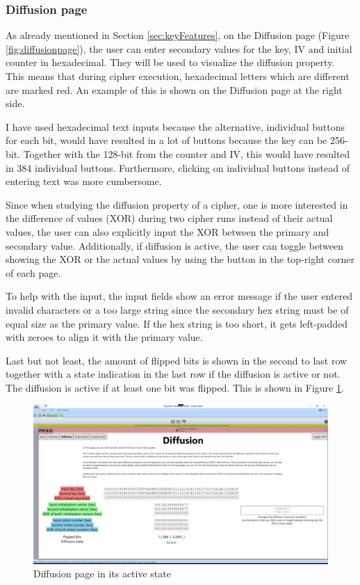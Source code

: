 \subsubsection{Diffusion page}

As already mentioned in Section \ref{sec:keyFeatures}, on the Diffusion page (Figure \ref{fig:diffusionpage}), the user can enter secondary values for the key, IV and initial counter in hexadecimal. They will be used to visualize the diffusion property. This means that during cipher execution, hexadecimal letters which are different are marked red. An example of this is shown on the Diffusion page at the right side.

I have used hexadecimal text inputs because the alternative, individual buttons for each bit, would have resulted in a lot of buttons because the key can be 256-bit. Together with the 128-bit from the counter and IV, this would have resulted in 384 individual buttons. Furthermore, clicking on individual buttons instead of entering text was more cumbersome.

Since when studying the diffusion property of a cipher, one is more interested in the difference of values (XOR) during two cipher runs instead of their actual values, the user can also explicitly input the XOR between the primary and secondary value. Additionally, if diffusion is active, the user can toggle between showing the XOR or the actual values by using the button in the top-right corner of each page.

To help with the input, the input fields show an error message if the user entered invalid characters or a too large string since the secondary hex string must be of equal size as the primary value. If the hex string is too short, it gets left-padded with zeroes to align it with the primary value.

Last but not least, the amount of flipped bits is shown in the second to last row together with a state indication in the last row if the diffusion is active or not. The diffusion is active if at least one bit was flipped. This is shown in Figure \ref{fig:diffusion.active}.

\begin{figure}
\centering
\includegraphics[width=\textwidth]{figures/ct2/diffusion/diffusion-active.png}
\caption{Diffusion page in its active state}
\label{fig:diffusion.active}
\end{figure}

